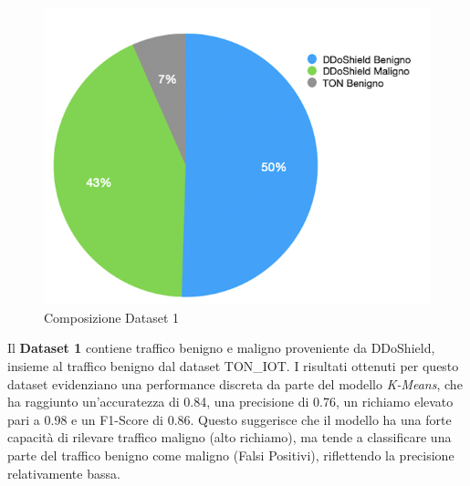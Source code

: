 \begin{figure}[htbp]
\centering
\includegraphics[scale= 0.8]{UNINA_MSc_Thesis_Project/img/chapterRisulati/composizione_DATASET_1 centrata.png}
  \caption{Composizione Dataset 1}
\end{figure}

\begin{table}[htbp]
\centering
\renewcommand{\arraystretch}{1.5} %
\caption{Metriche di performance per Dataset 1}
\label{tab:performance_metrics}
\end{table}

Il \textbf{Dataset 1} contiene traffico benigno e maligno proveniente da DDoShield, insieme al traffico benigno dal dataset TON\_IOT. I risultati ottenuti per questo dataset evidenziano una performance discreta da parte del modello \textit{K-Means}, che ha raggiunto un'accuratezza di 0.84, una precisione di 0.76, un richiamo elevato pari a 0.98 e un F1-Score di 0.86. Questo suggerisce che il modello ha una forte capacità di rilevare traffico maligno (alto richiamo), ma tende a classificare una parte del traffico benigno come maligno (Falsi Positivi), riflettendo la precisione relativamente bassa.
 
